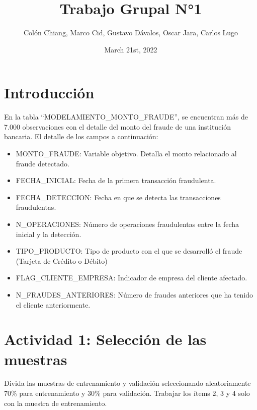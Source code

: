 \documentclass[
	11pt, %
	spanish, %
]{fphw}
\title{Trabajo Grupal N°1} %
\author{Col\'on Chiang, Marco Cid, Gustavo D\'avalos, Oscar Jara, Carlos Lugo} %
\date{March 21st, 2022} %
\institute{Universidad Adolfo Ibáñez \\ Magíster en Data Science} %
\begin{document}
\maketitle %


\section*{Introducción}
En la tabla ``MODELAMIENTO\_MONTO\_FRAUDE'', se encuentran más de 7.000 observaciones con el detalle del monto del fraude de una institución bancaria. El detalle de los campos a continuación:
\begin{itemize}
\item MONTO\_FRAUDE: Variable objetivo. Detalla el monto relacionado al fraude detectado.
\item FECHA\_INICIAL: Fecha de la primera transacción fraudulenta.
\item FECHA\_DETECCION: Fecha en que se detecta las transacciones fraudulentas.
\item N\_OPERACIONES: Número de operaciones fraudulentas entre la fecha inicial y la detección.
\item TIPO\_PRODUCTO: Tipo de producto con el que se desarrolló el fraude (Tarjeta de Crédito o Débito)
\item FLAG\_CLIENTE\_EMPRESA: Indicador de empresa del cliente afectado.
\item N\_FRAUDES\_ANTERIORES: Número de fraudes anteriores que ha tenido el cliente anteriormente.
\end{itemize}


\newpage
\section*{Actividad 1: Selección de las muestras}

\begin{problem}
	Divida las muestras de entrenamiento y validación seleccionando aleatoriamente 70\% para entrenamiento y 30\% para validación. Trabajar los ítems 2, 3 y 4 solo con la muestra de entrenamiento.
\end{problem}
\end{document}
